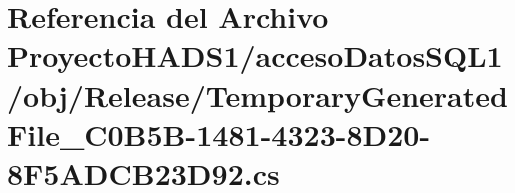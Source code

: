 \hypertarget{_proyecto_h_a_d_s1_2acceso_datos_s_q_l1_2obj_2_release_2_temporary_generated_file__036_c0_b5_b-1ae3e0dfeb6cecf8ca18639aea4ba0669}{}\section{Referencia del Archivo Proyecto\+H\+A\+D\+S1/acceso\+Datos\+S\+Q\+L1/obj/\+Release/\+Temporary\+Generated\+File\+\_\+C0\+B5\+B-\/1481-\/4323-\/8\+D20-\/8\+F5\+A\+D\+C\+B23\+D92.cs}
\label{_proyecto_h_a_d_s1_2acceso_datos_s_q_l1_2obj_2_release_2_temporary_generated_file__036_c0_b5_b-1ae3e0dfeb6cecf8ca18639aea4ba0669}
